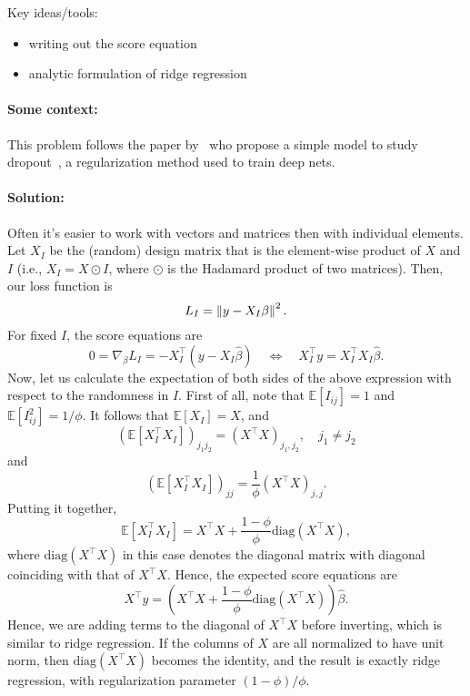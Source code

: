 Key ideas/tools:
\begin{itemize}
\item writing out the score equation
\item analytic formulation of ridge regression
\end{itemize}



\paragraph{Some context:} This problem follows the paper by~\citet*{wager2013dropout} who propose a simple model to study dropout~\citep{srivastava2014dropout}, a regularization method used to train deep nets. 
\paragraph{Solution:}
Often it's easier to work with vectors and matrices then with individual elements. Let $X_I$ be the (random) design matrix that is the element-wise product of $X$ and $I$ (i.e., $X_I = X \odot I$, where $\odot$ is the Hadamard product of two matrices). Then, our loss function is
\begin{equation*}
L_I = \left \lVert y - X_I \beta \right \rVert^2.
\end{equation*}
For fixed $I$, the score equations are
\begin{equation*}
0 = \nabla_\beta L_I = -X_I^\top  (y - X_I \hat \beta) \quad \Longleftrightarrow \quad X_I^\top  y = X_I^\top  X_I \hat \beta.
\end{equation*}
Now, let us calculate the expectation of both sides of the above expression with respect to the randomness in $I$. First of all, note that $\mathbb E[I_{ij}] = 1$ and $\mathbb E[I_{ij}^2] = 1/\phi$. It follows that $\mathbb E[X_I] = X$, and
\begin{equation*}
\left(\mathbb E[X_I^\top  X_I]\right)_{j_1 j_2} = (X^\top  X)_{j_1, j_2}, \quad j_1 \neq j_2
\end{equation*}
and
\begin{equation*}
\left(\mathbb E[X_I^\top  X_I]\right)_{j j} = \frac{1}{\phi}(X^\top  X)_{j, j}.
\end{equation*}
Putting it together,
\begin{equation*}
\mathbb E[X_I^\top  X_I] = X^\top  X + \frac{1-\phi}{\phi} \text{diag}(X^\top  X),
\end{equation*}
where $\text{diag}(X^\top  X)$ in this case denotes the diagonal matrix with diagonal coinciding with that of $X^\top  X$.
Hence, the expected score equations are
\begin{equation*}
X^\top  y = \left(X^\top  X + \frac{1-\phi}{\phi} \text{diag}(X^\top  X)\right)\hat \beta.
\end{equation*}	
Hence, we are adding terms to the diagonal of $X^\top  X$ before inverting, which is similar to ridge regression. If the columns of $X$ are all normalized to have unit norm, then $\text{diag}(X^\top  X)$ becomes the identity, and the result is exactly ridge regression, with regularization parameter $(1-\phi)/\phi$.

